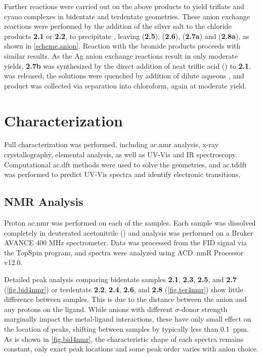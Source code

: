 Further reactions were carried out on the above products to yield triflate and cyano complexes in bidentate and terdentate geometries. These anion exchange reactions were performed by the addition of the silver salt to the chloride products \textbf{2.1} or \textbf{2.2}, to precipitate , leaving  (\textbf{2.5}),  (\textbf{2.6}),  (\textbf{2.7a}) and  (\textbf{2.8a}), as shown in \autoref{scheme.anion}. Reaction with the bromide products proceeds with similar results. As the Ag anion exchange reactions result in only moderate yields, \textbf{2.7b} was synthesized by the direct addition of neat triflic acid () to \textbf{2.1}.  was released, the solutions were quenched by addition of dilute aqueous , and product was collected via separation into chloroform, again at moderate yield. 

\section{Characterization}

Full characterization was performed, including \Gls{ac.nmr} analysis, x-ray crystallography, elemental analysis, as well as UV-Vis and IR spectroscopy. Computational \gls{ac.dft} methods were used to solve the geometries, and \gls{ac.tddft} was performed to predict UV-Vis spectra and identify electronic transitions. 

\subsection{NMR Analysis}

Proton \gls{ac.nmr} was performed on each of the samples. Each sample was dissolved completely in deuterated acetonitrile () and analysis was performed on a Bruker AVANCE 400 MHz spectrometer. Data was processed from the FID signal via the TopSpin program, and spectra were analyzed using ACD~nmR Processor v12.0. 

Detailed peak analysis comparing bidentate samples \textbf{2.1}, \textbf{2.3}, \textbf{2.5}, and \textbf{2.7} (\autoref{fig.bid4nmr}) or terdentate \textbf{2.2}, \textbf{2.4}, \textbf{2.6}, and \textbf{2.8} (\autoref{fig.ter4nmr}) show little difference between samples. This is due to the distance between the anion and any protons on the ligand. While anions with different $\sigma$-donor strength marginally impact the metal-ligand interactions, these have only small effect on the location of peaks, shifting between samples by typically less than 0.1~ppm. As is shown in \autoref{fig.bid4nmr}, the characteristic shape of each spectra remains constant, only exact peak locations and some peak order varies with anion choice. 


